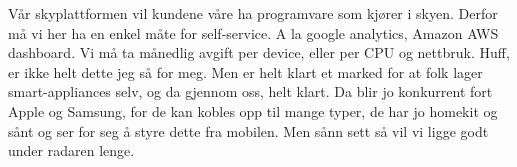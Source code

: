Vår skyplattformen vil kundene våre ha programvare som kjører i skyen. Derfor
må vi her ha en enkel måte for self-service. A la google analytics, Amazon AWS
dashboard. Vi må ta månedlig avgift per device, eller per CPU og nettbruk.
Huff, er ikke helt dette jeg så for meg. Men er helt klart et marked for at
folk lager smart-appliances selv, og da gjennom oss, helt klart. Da blir jo
konkurrent fort Apple og Samsung, for de kan kobles opp til mange typer, de har
jo homekit og sånt og ser for seg å styre dette fra mobilen.
Men sånn sett så vil vi ligge godt under radaren lenge.

